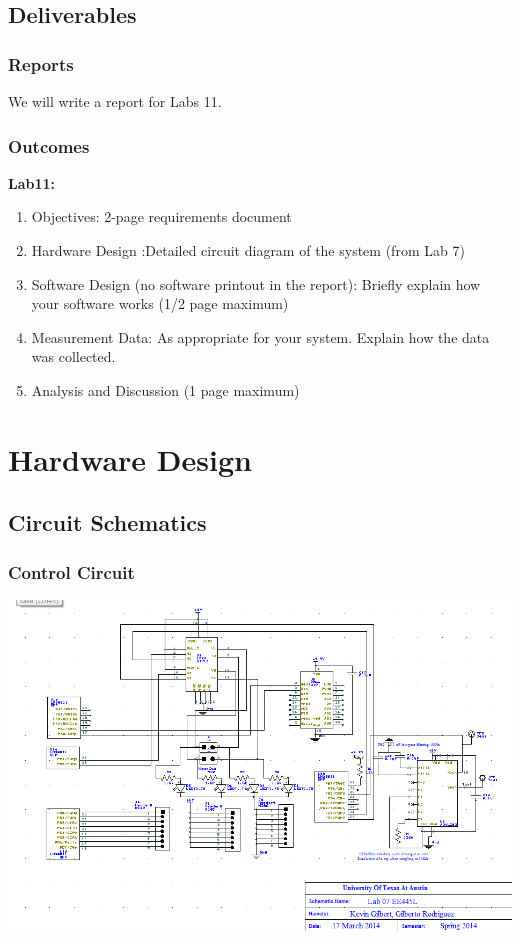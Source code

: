 \documentclass[twoside]{article}
\begin{document}
\subsection{Deliverables}
\subsubsection{Reports}
We will write a report for Labs 11.
\subsubsection{Outcomes}

\noindent \bf{Lab11:}
\begin{enumerate}
\item Objectives: 2-page requirements document
\item Hardware Design :Detailed circuit diagram of the system (from Lab 7)
\item Software Design (no software printout in the report): Briefly explain how your software works (1/2 page maximum)
\item Measurement Data: As appropriate for your system. Explain how the data was collected.
\item Analysis and Discussion (1 page maximum) 
\end{enumerate}

\section{Hardware Design}
	\subsection{Circuit Schematics}
		\subsubsection{Control Circuit}
			\includegraphics[width=\textwidth]{circuitDiagram}
\end{document}
